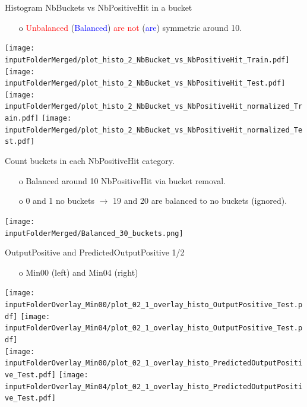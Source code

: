 \documentclass{beamer}
\begin{document}
\begin{frame}{Histogram NbBuckets vs NbPositiveHit in a bucket}
\begin{enumerate}
\item[o] \textcolor{red}{Unbalanced} (\textcolor{blue}{Balanced})  \textcolor{red}{are not} (\textcolor{blue}{are}) symmetric around 10. 
\end{enumerate}
\centering
\texttt{[image: \\inputFolderMerged/plot\_histo\_2\_NbBucket\_vs\_NbPositiveHit\_Train.pdf]}
\texttt{[image: \\inputFolderMerged/plot\_histo\_2\_NbBucket\_vs\_NbPositiveHit\_Test.pdf]}\\
\texttt{[image: \\inputFolderMerged/plot\_histo\_2\_NbBucket\_vs\_NbPositiveHit\_normalized\_Train.pdf]}
\texttt{[image: \\inputFolderMerged/plot\_histo\_2\_NbBucket\_vs\_NbPositiveHit\_normalized\_Test.pdf]}\\
\end{frame}

\begin{frame}{Count buckets in each NbPositiveHit category.}
\begin{enumerate}
\item[o] Balanced around 10 NbPositiveHit via bucket removal.
\item[o] 0 and 1 no buckets $\rightarrow$ 19 and 20 are balanced to no buckets (ignored). 
\end{enumerate}
\centering
\texttt{[image: \\inputFolderMerged/Balanced\_30\_buckets.png]}
\end{frame}

\begin{frame}{OutputPositive and PredictedOutputPositive 1/2}
\begin{enumerate}
\item[o] Min00 (left) and Min04 (right)
\end{enumerate}
\centering
\texttt{[image: \\inputFolderOverlay\_Min00/plot\_02\_1\_overlay\_histo\_OutputPositive\_Test.pdf]}
\texttt{[image: \\inputFolderOverlay\_Min04/plot\_02\_1\_overlay\_histo\_OutputPositive\_Test.pdf]}\\
\texttt{[image: \\inputFolderOverlay\_Min00/plot\_02\_1\_overlay\_histo\_PredictedOutputPositive\_Test.pdf]}
\texttt{[image: \\inputFolderOverlay\_Min04/plot\_02\_1\_overlay\_histo\_PredictedOutputPositive\_Test.pdf]}\\
\end{frame}
\end{document}
